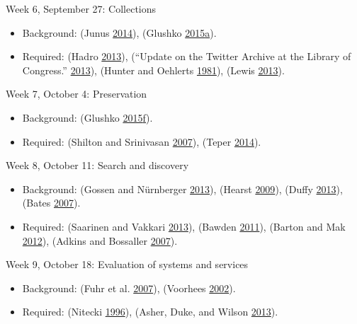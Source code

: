 \documentclass[]{article}
\providecommand{\tightlist}{%
  \setlength{\itemsep}{0pt}\setlength{\parskip}{0pt}}
\begin{document}
Week 6, September 27: Collections

\begin{itemize}
\tightlist
\item
  Background: (Junus
  \protect\hyperlink{ref-junusux5fdigitalux5f2014}{2014}), (Glushko
  \protect\hyperlink{ref-glushkoux5factivitiesux5f2015}{2015}\protect\hyperlink{ref-glushkoux5factivitiesux5f2015}{a}).
\item
  Required: (Hadro
  \protect\hyperlink{ref-hadroux5fwhatsux5f2013}{2013}), (``Update on
  the Twitter Archive at the Library of Congress.''
  \protect\hyperlink{ref-ux5fupdateux5f2013}{2013}), (Hunter and
  Oehlerts \protect\hyperlink{ref-hunterux5ftwoux5f1981}{1981}), (Lewis
  \protect\hyperlink{ref-lewisux5fstacksux5f2013}{2013}).
\end{itemize}

Week 7, October 4: Preservation

\begin{itemize}
\tightlist
\item
  Background: (Glushko
  \protect\hyperlink{ref-glushkoux5forganizingux5f2015}{2015}\protect\hyperlink{ref-glushkoux5forganizingux5f2015}{f}).
\item
  Required: (Shilton and Srinivasan
  \protect\hyperlink{ref-shiltonux5fparticipatoryux5f2007}{2007}),
  (Teper \protect\hyperlink{ref-teperux5fselectionux5f2014}{2014}).
\end{itemize}

Week 8, October 11: Search and discovery

\begin{itemize}
\tightlist
\item
  Background: (Gossen and Nürnberger
  \protect\hyperlink{ref-gossenux5fspecificsux5f2013}{2013}), (Hearst
  \protect\hyperlink{ref-hearstux5fevaluationux5f2009}{2009}), (Duffy
  \protect\hyperlink{ref-duffyux5fsearchingux5f2013}{2013}), (Bates
  \protect\hyperlink{ref-batesux5fwhatux5f2007}{2007}).
\item
  Required: (Saarinen and Vakkari
  \protect\hyperlink{ref-saarinenux5fsignux5f2013}{2013}), (Bawden
  \protect\hyperlink{ref-bawdenux5fencounteringux5f2011}{2011}), (Barton
  and Mak \protect\hyperlink{ref-bartonux5foldux5f2012}{2012}), (Adkins
  and Bossaller
  \protect\hyperlink{ref-adkinsux5ffictionux5f2007}{2007}).
\end{itemize}

Week 9, October 18: Evaluation of systems and services

\begin{itemize}
\tightlist
\item
  Background: (Fuhr et al.
  \protect\hyperlink{ref-fuhrux5fevaluationux5f2007}{2007}), (Voorhees
  \protect\hyperlink{ref-petersux5fphilosophyux5f2002}{2002}).
\item
  Required: (Nitecki
  \protect\hyperlink{ref-niteckiux5fchangingux5f1996}{1996}), (Asher,
  Duke, and Wilson
  \protect\hyperlink{ref-asherux5fpathsux5f2013}{2013}).
\end{itemize}
\end{document}
